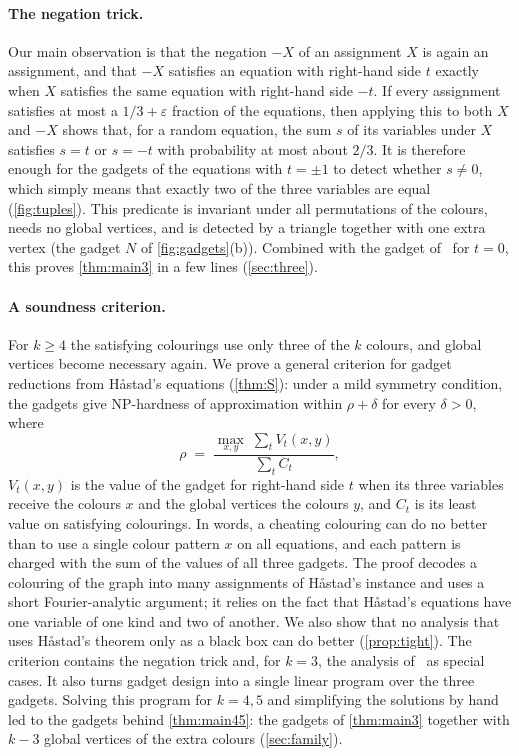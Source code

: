 \documentclass[11pt,letterpaper]{article}
\theoremstyle{remark}
\newcommand{\eps}{\varepsilon}
\begin{document}
\paragraph{The negation trick.}
Our main observation is that the negation $-X$ of an assignment $X$ is again an assignment, and that $-X$
satisfies an equation with right-hand side $t$ exactly when $X$ satisfies the same equation with
right-hand side $-t$. If every assignment satisfies at most a $1/3+\eps$ fraction of the equations, then
applying this to both $X$ and $-X$ shows that, for a random equation, the sum $s$ of its variables under
$X$ satisfies $s=t$ or $s=-t$ with probability at most about $2/3$. It is therefore enough for the gadgets of
the equations with $t=\pm1$ to detect whether $s\ne0$, which simply means that exactly two of the three variables are equal (\cref{fig:tuples}). This predicate is invariant under all permutations of the colours, needs no global
vertices, and is detected by a triangle together with one extra vertex (the gadget $N$ of \cref{fig:gadgets}(b)). Combined with the gadget
of~\cite{NRT25} for $t=0$, this proves \cref{thm:main3} in a few lines (\cref{sec:three}).

\paragraph{A soundness criterion.}
For $k\ge4$ the satisfying colourings use only three of the $k$ colours, and global vertices become
necessary again. We prove a general criterion for gadget reductions from H\aa stad's equations
(\cref{thm:S}): under a mild symmetry condition, the gadgets give NP-hardness of approximation within
$\rho+\delta$ for every $\delta>0$, where
\[
  \rho \;=\; \frac{\max_{x,y}\; \sum_{t} V_t(x,y)}{\sum_{t} C_t},
\]
$V_t(x,y)$ is the value of the gadget for right-hand side $t$ when its three variables receive the
colours $x$ and the global vertices the colours $y$, and $C_t$ is its least value on satisfying colourings. In
words, a cheating colouring can do no better than to use a single colour pattern $x$ on all equations,
and each pattern is charged with the sum of the values of all three gadgets. The proof decodes a
colouring of the graph into many assignments of H\aa stad's instance and uses a short Fourier-analytic
argument; it relies on the fact that H\aa stad's equations have one variable of one kind and two of
another. We also show that no analysis that uses H\aa stad's theorem only as a black box can do better
(\cref{prop:tight}). The criterion contains the negation trick and, for $k=3$, the analysis
of~\cite{NRT25} as special cases. It also turns gadget design into a single linear program over the three
gadgets. Solving this program for $k=4,5$ and simplifying the solutions by hand led to the gadgets behind
\cref{thm:main45}: the gadgets of \cref{thm:main3} together with $k-3$ global vertices of the extra colours
(\cref{sec:family}).
\end{document}
